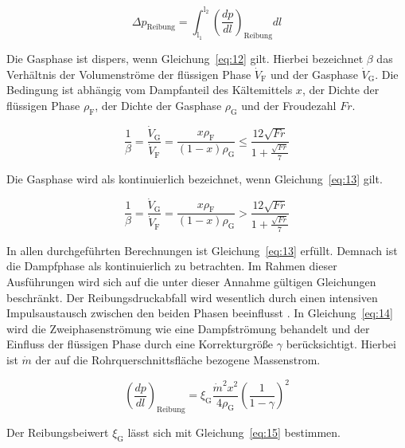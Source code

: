 \begin{equation}
\label{eq:11}
\Delta p_{\mathrm{Reibung}} = \int_{\mathrm{l_1}}^{\mathrm{l_2}} \left( \frac{dp}{dl} \right)_{\mathrm{Reibung}} dl
\end{equation}

\clearpage


Die Gasphase ist dispers, wenn Gleichung~\ref{eq:12} gilt. Hierbei bezeichnet $\beta$ das Verhältnis der Volumenströme der flüssigen Phase $\dot{V}_\mathrm{F}$ und der Gasphase $\dot{V}_\mathrm{G}$. Die Bedingung ist abhängig vom Dampfanteil des Kältemittels $x$, der Dichte der flüssigen Phase $\rho_\mathrm{F}$, der Dichte der Gasphase $\rho_\mathrm{G}$ und der Froudezahl $Fr$.

\begin{equation}
\label{eq:12}
\frac{1}{\beta} = \frac{\dot{V}_\mathrm{G}}{\dot{V}_\mathrm{F}} = \frac{x\rho_\mathrm{F}}{(1-x)\rho_\mathrm{G}} \leq \frac{12\sqrt{Fr}}{1+\frac{\sqrt{Fr}}{7}}
\end{equation}

Die Gasphase wird als kontinuierlich bezeichnet, wenn Gleichung~\ref{eq:13} gilt.

\begin{equation}
\label{eq:13}
\frac{1}{\beta} = \frac{\dot{V}_\mathrm{G}}{\dot{V}_\mathrm{F}} = \frac{x\rho_\mathrm{F}}{(1-x)\rho_\mathrm{G}} > \frac{12\sqrt{Fr}}{1+\frac{\sqrt{Fr}}{7}}
\end{equation}

In allen durchgeführten Berechnungen ist Gleichung~\ref{eq:13} erfüllt. Demnach ist die Dampfphase als kontinuierlich zu betrachten. Im Rahmen dieser Ausführungen wird sich auf die unter dieser Annahme gültigen Gleichungen beschränkt. Der Reibungsdruckabfall wird wesentlich durch einen intensiven Impulsaustausch zwischen den beiden Phasen beeinflusst \cite{Kesper.1976}. In Gleichung~\ref{eq:14} wird die Zweiphasenströmung wie eine Dampfströmung behandelt und der Einfluss der flüssigen Phase durch eine Korrekturgröße $\gamma$ berücksichtigt. Hierbei ist $\dot{m}$ der auf die Rohrquerschnittsfläche bezogene Massenstrom.

\begin{equation}
\label{eq:14}
\left( \frac{dp}{dl} \right)_{\mathrm{Reibung}} = \xi_\mathrm{G} \frac{\dot{m}^2 x^2}{4\rho_\mathrm{G}} \left(\frac{1}{1-\gamma} \right)^2
\end{equation}

Der Reibungsbeiwert $\xi_\mathrm{G}$ lässt sich mit Gleichung~\ref{eq:15} bestimmen.

